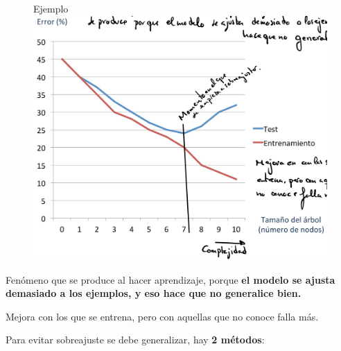 \documentclass[12pt]{report} %
\begin{document}
\begin{figure}[H]
	Ejemplo
	{\includegraphics[scale=.2]{image-20210305195646416.png}}
\end{figure}

Fenómeno que se produce al hacer aprendizaje, porque \textbf{el modelo
se ajusta demasiado a los ejemplos, y eso hace que no generalice bien.}

Mejora con los que se entrena, pero con aquellas que no conoce falla
más.

Para evitar sobreajuste se debe generalizar, hay \textbf{2 métodos}:
\end{document}
